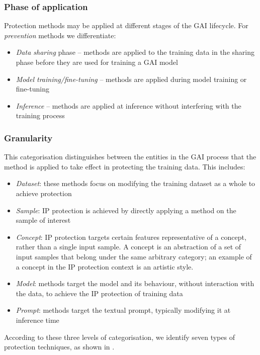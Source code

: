 \documentclass[conference,table]{IEEEtran}
\begin{document}
\subsubsection{Phase of application}
Protection methods may be applied at different stages of the GAI lifecycle. 
For \textit{prevention} methods we differentiate:
\begin{itemize}
    \item \textit{Data sharing} phase -- methods are applied to the training data in the sharing phase before they are used for training a GAI model
    \item \textit{Model training/fine-tuning} -- methods are applied during model training or fine-tuning
    \item \textit{Inference} -- methods are applied at inference without interfering with the training process
\end{itemize}
\subsubsection{Granularity}
This categorisation distinguishes between the entities in the GAI process that the method is applied to take effect in protecting the training data. 
This includes:
\begin{itemize}
    \item \textit{Dataset}: these methods focus on modifying the training dataset as a whole to achieve protection
    \item \textit{Sample}: IP protection is achieved by directly applying a method on the sample of interest
    \item \textit{Concept}: IP protection targets certain features representative of a concept, rather than a single input sample. A concept is an abstraction of a set of input samples that belong under the same arbitrary category; an example of a concept in the IP protection context is an artistic style.
    \item \textit{Model}: methods target the model and its behaviour, without interaction with the data, to achieve the IP protection of training data
    \item \textit{Prompt}: methods target the textual prompt, typically modifying it at inference time
\end{itemize}

According to these three levels of categorisation, we identify seven types of protection techniques, as shown in . 

 
\end{document}
